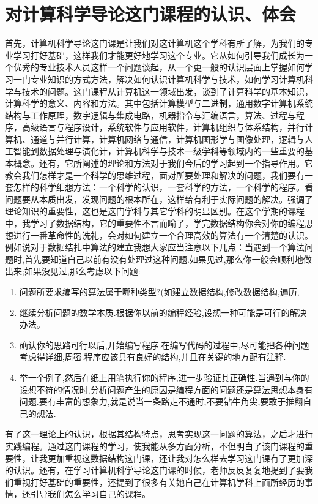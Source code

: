 \documentclass{article}
\begin{document}
\section{对计算科学导论这门课程的认识、体会}
首先，计算机科学导论这门课是让我们对这计算机这个学科有所了解，为我们的专业学习打好基础，这样我们才能更好地学习这个专业。它从如何引导我们成长为一个优秀的专业技术人员这样一个问题谈起，从一个更一般的认识层面上掌握如何学习一门专业知识的方式方法，解决如何认识计算机科学与技术，如何学习计算机科学与技术的问题。这门课程从计算机这一领域出发，谈到了计算科学的基本知识，计算科学的意义、内容和方法。其中包括计算模型与二进制，通用数字计算机系统结构与工作原理，数字逻辑与集成电路，机器指令与汇编语言，算法、过程与程序，高级语言与程序设计，系统软件与应用软件，计算机组织与体系结构，并行计算机、通道与并行计算，计算机网络与通信，计算机图形学与图像处理，逻辑与人工智能到数据处理与演化计，计算机科学与技术一级学科等领域内的一些重要的基本概念。还有，它所阐述的理论和方法对于我们今后的学习起到一个指导作用。它教会我们怎样才是一个科学的思维过程，面对所要处理和解决的问题，我们要有一套怎样的科学细想方法：一个科学的认识，一套科学的方法，一个科学的程序。看问题要从本质出发，发现问题的根本所在，这样给有利于实际问题的解决。强调了理论知识的重要性，这也是这门学科与其它学科的明显区别。在这个学期的课程中，我学习了数据结构，它的重要性不言而喻了，学完数据结构你会对你的编程思想进行一番革命性的洗礼，会对如何建立一个合理高效的算法有一个清楚的认识。例如说对于数据结扎中算法的建立我想大家应当注意以下几点：当遇到一个算法问题时,首先要知道自己以前有没有处理过这种问题.如果见过,那么你一般会顺利地做出来;如果没见过,那么考虑以下问题:
\begin{enumerate}[(1)]  
    \item 问题所要求编写的算法属于哪种类型?(如建立数据结构,修改数据结构,遍历,  
    \item 继续分析问题的数学本质.根据你以前的编程经验,设想一种可能是可行的解决办法。
    \item 确认你的思路可行以后,开始编写程序.在编写代码的过程中,尽可能把各种问题考虑得详细,周密.程序应该具有良好的结构,并且在关键的地方配有注释.
    \item 举一个例子,然后在纸上用笔执行你的程序,进一步验证其正确性.当遇到与你的设想不符的情况时,分析问题产生的原因是编程方面的问题还是算法思想本身有问题.要有丰富的想象力,就是说当一条路走不通时,不要钻牛角尖,要敢于推翻自己的想法.
\end{enumerate}

有了这一理论上的认识，根据其结构特点，思考实现这一问题的算法，之后才进行实践编程。通过这门课程的学习，使我能从多方面分析，不但明白了该门课程的重要性，让我更加重视这数据结构这门课，还让我对怎么样去学习这门课有了更加深  的认识。还有，在学习计算机科学导论这门课的时候，老师反反复复地提到了要我们重视打好基础的重要性，还提到了很多有关她自己在计算机学科上面所经历的事情，还引导我们怎么学习自己的课程。
\end{document}
